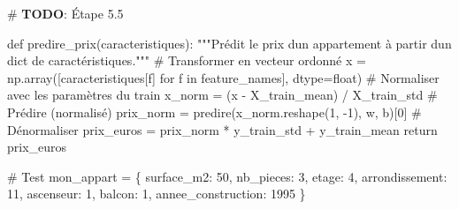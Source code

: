 \documentclass[
  french,
  11pt,
  a4paper,
]{scrbook}
\newenvironment{Shaded}{}{}
\newcommand{\AlertTok}[1]{\textcolor[rgb]{1.00,0.33,0.33}{\textbf{#1}}}
\newcommand{\BuiltInTok}[1]{\textcolor[rgb]{0.84,0.23,0.29}{#1}}
\newcommand{\CommentTok}[1]{\textcolor[rgb]{0.42,0.45,0.49}{#1}}
\newcommand{\ControlFlowTok}[1]{\textcolor[rgb]{0.84,0.23,0.29}{#1}}
\newcommand{\DecValTok}[1]{\textcolor[rgb]{0.00,0.36,0.77}{#1}}
\newcommand{\KeywordTok}[1]{\textcolor[rgb]{0.84,0.23,0.29}{#1}}
\newcommand{\NormalTok}[1]{\textcolor[rgb]{0.14,0.16,0.18}{#1}}
\newcommand{\OperatorTok}[1]{\textcolor[rgb]{0.14,0.16,0.18}{#1}}
\newcommand{\StringTok}[1]{\textcolor[rgb]{0.01,0.18,0.38}{#1}}
\begin{document}
\begin{Shaded}
\begin{Highlighting}[]
\CommentTok{\# }\AlertTok{TODO}\CommentTok{: Étape 5.5}
\end{Highlighting}
\end{Shaded}

\begin{tcolorbox}[enhanced jigsaw, arc=.35mm, bottomrule=.15mm, bottomtitle=1mm, breakable, colback=white, colbacktitle=quarto-callout-tip-color!10!white, colframe=quarto-callout-tip-color-frame, coltitle=black, left=2mm, leftrule=.75mm, opacityback=0, opacitybacktitle=0.6, rightrule=.15mm, title=\textcolor{quarto-callout-tip-color}{\faLightbulb}\hspace{0.5em}{✅ Corrigé Étape 5.5}, titlerule=0mm, toprule=.15mm, toptitle=1mm]

\begin{Shaded}
\begin{Highlighting}[]
\KeywordTok{def}\NormalTok{ predire\_prix(caracteristiques):}
    \CommentTok{"""Prédit le prix d\textquotesingle{}un appartement à partir d\textquotesingle{}un dict de caractéristiques."""}
    \CommentTok{\# Transformer en vecteur ordonné}
\NormalTok{    x }\OperatorTok{=}\NormalTok{ np.array([caracteristiques[f] }\ControlFlowTok{for}\NormalTok{ f }\KeywordTok{in}\NormalTok{ feature\_names], dtype}\OperatorTok{=}\BuiltInTok{float}\NormalTok{)}
    \CommentTok{\# Normaliser avec les paramètres du train}
\NormalTok{    x\_norm }\OperatorTok{=}\NormalTok{ (x }\OperatorTok{{-}}\NormalTok{ X\_train\_mean) }\OperatorTok{/}\NormalTok{ X\_train\_std}
    \CommentTok{\# Prédire (normalisé)}
\NormalTok{    prix\_norm }\OperatorTok{=}\NormalTok{ predire(x\_norm.reshape(}\DecValTok{1}\NormalTok{, }\OperatorTok{{-}}\DecValTok{1}\NormalTok{), w, b)[}\DecValTok{0}\NormalTok{]}
    \CommentTok{\# Dénormaliser}
\NormalTok{    prix\_euros }\OperatorTok{=}\NormalTok{ prix\_norm }\OperatorTok{*}\NormalTok{ y\_train\_std }\OperatorTok{+}\NormalTok{ y\_train\_mean}
    \ControlFlowTok{return}\NormalTok{ prix\_euros}

\CommentTok{\# Test}
\NormalTok{mon\_appart }\OperatorTok{=}\NormalTok{ \{}
    \StringTok{\textquotesingle{}surface\_m2\textquotesingle{}}\NormalTok{: }\DecValTok{50}\NormalTok{,}
    \StringTok{\textquotesingle{}nb\_pieces\textquotesingle{}}\NormalTok{: }\DecValTok{3}\NormalTok{,}
    \StringTok{\textquotesingle{}etage\textquotesingle{}}\NormalTok{: }\DecValTok{4}\NormalTok{,}
    \StringTok{\textquotesingle{}arrondissement\textquotesingle{}}\NormalTok{: }\DecValTok{11}\NormalTok{,}
    \StringTok{\textquotesingle{}ascenseur\textquotesingle{}}\NormalTok{: }\DecValTok{1}\NormalTok{,}
    \StringTok{\textquotesingle{}balcon\textquotesingle{}}\NormalTok{: }\DecValTok{1}\NormalTok{,}
    \StringTok{\textquotesingle{}annee\_construction\textquotesingle{}}\NormalTok{: }\DecValTok{1995}
\NormalTok{\}}


\end{Highlighting}
\end{Shaded}
\end{tcolorbox}
\end{document}

